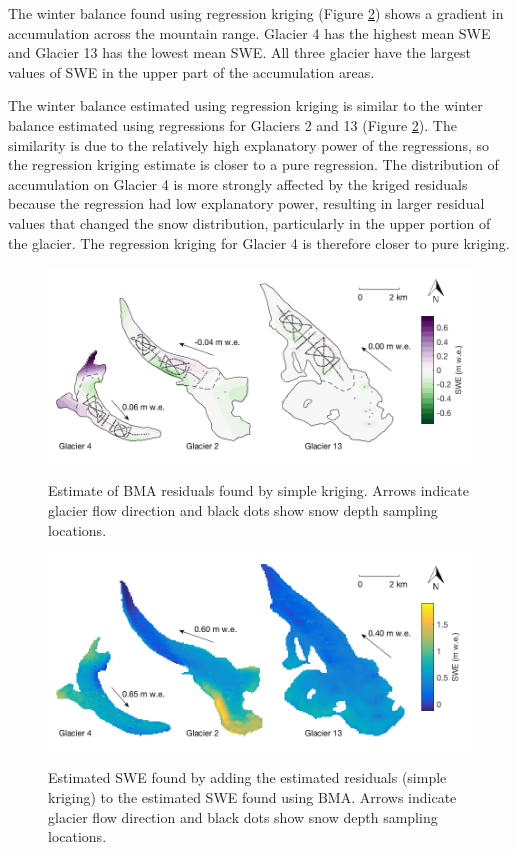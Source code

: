 \documentclass[12pt]{article}
\newcommand{\topomap}{Arrows indicate glacier flow direction and black dots show snow depth sampling locations. }
\begin{document}
The winter balance found using regression kriging (Figure \ref{fig:Regression-Kriging}) shows a gradient in accumulation across the mountain range. Glacier 4 has the highest mean SWE and Glacier 13 has the lowest mean SWE. All three glacier have the largest values of SWE in the upper part of the accumulation areas. 

The winter balance estimated using regression kriging is similar to the winter balance estimated using regressions for Glaciers 2 and 13 (Figure \ref{fig:Regression-Kriging}). The similarity is due to the relatively high explanatory power of the regressions, so the regression kriging estimate is closer to a pure regression. The distribution of accumulation on Glacier 4 is more strongly affected by the kriged residuals because the regression had low explanatory power, resulting in larger residual values that changed the snow distribution, particularly in the upper portion of the glacier. The regression kriging for Glacier 4 is therefore closer to pure kriging.

\begin{figure}
	\centering
	\includegraphics[width = \textwidth]{residualsKriged.png}\\
	\caption{Estimate of BMA residuals found by simple kriging. \topomap}
	\label{fig:residualsKRIGING}
\end{figure}

\begin{figure}
	\centering
	\includegraphics[width = \textwidth]{RegressionKriging.png}\\
	\caption{Estimated SWE found by adding the estimated residuals (simple kriging) to the estimated SWE found using BMA. \topomap}
	\label{fig:Regression-Kriging}
\end{figure}
\end{document}

